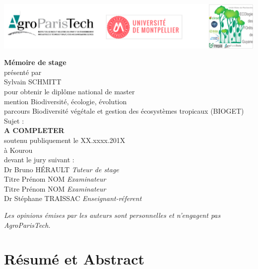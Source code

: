 \documentclass[]{article}
\let\oldsection\section
\renewcommand\section{\newpage\oldsection}
\theoremstyle{definition}
\theoremstyle{definition}
\theoremstyle{remark}
\begin{document}
  \includegraphics{images/logos}
  
  \begin{center}
    \LARGE{\textbf{Mémoire de stage}} \\
    \vspace*{\fill}
    \large{présenté par} \\
    \large{Sylvain SCHMITT} \\
    \vspace*{\fill}
    \large{pour obtenir le diplôme national de master} \\
    \large{mention Biodiversité, écologie, évolution} \\
    \small{parcours Biodiversité végétale et gestion des écosystèmes tropicaux (BIOGET)} \\
    \vspace*{\fill}
    \large{Sujet :} \\
    \Large{\textbf{A COMPLETER}} \\
    \vspace*{\fill}
    \large{soutenu publiquement le XX.xxxx.201X} \\
    \large{à Kourou} \\
    \vspace*{\fill}
    \large{devant le jury suivant :} \\
    \vspace*{\fill}
    Dr Bruno HÉRAULT  \emph{Tuteur de stage} \\
    Titre Prénom NOM  \emph{Examinateur} \\
    Titre Prénom NOM  \emph{Examinateur} \\
    Dr Stéphane TRAISSAC  \emph{Enseignant-réferent} \\
  \end{center}
  
  \newpage
  \vspace*{\fill}
  \emph{Les opinions émises par les auteurs sont personnelles et n'engagent pas AgroParisTech.}
  \newpage

\tableofcontents

\section*{Résumé et Abstract}\label{resume-et-abstract}
\end{document}
